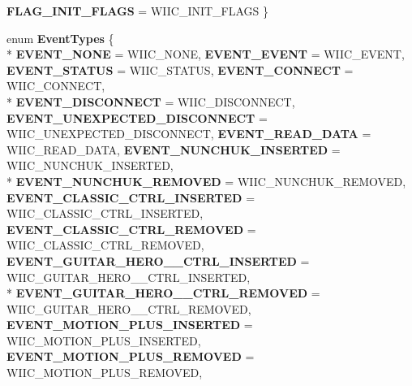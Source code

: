 \begin{DoxyCompactItemize}
{\bfseries F\-L\-A\-G\-\_\-\-I\-N\-I\-T\-\_\-\-F\-L\-A\-G\-S} =  W\-I\-I\-C\-\_\-\-I\-N\-I\-T\-\_\-\-F\-L\-A\-G\-S
 \}
\item 
enum {\bfseries Event\-Types} \{ \\*
{\bfseries E\-V\-E\-N\-T\-\_\-\-N\-O\-N\-E} =  W\-I\-I\-C\-\_\-\-N\-O\-N\-E, 
{\bfseries E\-V\-E\-N\-T\-\_\-\-E\-V\-E\-N\-T} =  W\-I\-I\-C\-\_\-\-E\-V\-E\-N\-T, 
{\bfseries E\-V\-E\-N\-T\-\_\-\-S\-T\-A\-T\-U\-S} =  W\-I\-I\-C\-\_\-\-S\-T\-A\-T\-U\-S, 
{\bfseries E\-V\-E\-N\-T\-\_\-\-C\-O\-N\-N\-E\-C\-T} =  W\-I\-I\-C\-\_\-\-C\-O\-N\-N\-E\-C\-T, 
\\*
{\bfseries E\-V\-E\-N\-T\-\_\-\-D\-I\-S\-C\-O\-N\-N\-E\-C\-T} =  W\-I\-I\-C\-\_\-\-D\-I\-S\-C\-O\-N\-N\-E\-C\-T, 
{\bfseries E\-V\-E\-N\-T\-\_\-\-U\-N\-E\-X\-P\-E\-C\-T\-E\-D\-\_\-\-D\-I\-S\-C\-O\-N\-N\-E\-C\-T} =  W\-I\-I\-C\-\_\-\-U\-N\-E\-X\-P\-E\-C\-T\-E\-D\-\_\-\-D\-I\-S\-C\-O\-N\-N\-E\-C\-T, 
{\bfseries E\-V\-E\-N\-T\-\_\-\-R\-E\-A\-D\-\_\-\-D\-A\-T\-A} =  W\-I\-I\-C\-\_\-\-R\-E\-A\-D\-\_\-\-D\-A\-T\-A, 
{\bfseries E\-V\-E\-N\-T\-\_\-\-N\-U\-N\-C\-H\-U\-K\-\_\-\-I\-N\-S\-E\-R\-T\-E\-D} =  W\-I\-I\-C\-\_\-\-N\-U\-N\-C\-H\-U\-K\-\_\-\-I\-N\-S\-E\-R\-T\-E\-D, 
\\*
{\bfseries E\-V\-E\-N\-T\-\_\-\-N\-U\-N\-C\-H\-U\-K\-\_\-\-R\-E\-M\-O\-V\-E\-D} =  W\-I\-I\-C\-\_\-\-N\-U\-N\-C\-H\-U\-K\-\_\-\-R\-E\-M\-O\-V\-E\-D, 
{\bfseries E\-V\-E\-N\-T\-\_\-\-C\-L\-A\-S\-S\-I\-C\-\_\-\-C\-T\-R\-L\-\_\-\-I\-N\-S\-E\-R\-T\-E\-D} =  W\-I\-I\-C\-\_\-\-C\-L\-A\-S\-S\-I\-C\-\_\-\-C\-T\-R\-L\-\_\-\-I\-N\-S\-E\-R\-T\-E\-D, 
{\bfseries E\-V\-E\-N\-T\-\_\-\-C\-L\-A\-S\-S\-I\-C\-\_\-\-C\-T\-R\-L\-\_\-\-R\-E\-M\-O\-V\-E\-D} =  W\-I\-I\-C\-\_\-\-C\-L\-A\-S\-S\-I\-C\-\_\-\-C\-T\-R\-L\-\_\-\-R\-E\-M\-O\-V\-E\-D, 
{\bfseries E\-V\-E\-N\-T\-\_\-\-G\-U\-I\-T\-A\-R\-\_\-\-H\-E\-R\-O\-\_\-\_\-\-C\-T\-R\-L\-\_\-\-I\-N\-S\-E\-R\-T\-E\-D} =  W\-I\-I\-C\-\_\-\-G\-U\-I\-T\-A\-R\-\_\-\-H\-E\-R\-O\-\_\-\_\-\-C\-T\-R\-L\-\_\-\-I\-N\-S\-E\-R\-T\-E\-D, 
\\*
{\bfseries E\-V\-E\-N\-T\-\_\-\-G\-U\-I\-T\-A\-R\-\_\-\-H\-E\-R\-O\-\_\-\_\-\-C\-T\-R\-L\-\_\-\-R\-E\-M\-O\-V\-E\-D} =  W\-I\-I\-C\-\_\-\-G\-U\-I\-T\-A\-R\-\_\-\-H\-E\-R\-O\-\_\-\_\-\-C\-T\-R\-L\-\_\-\-R\-E\-M\-O\-V\-E\-D, 
{\bfseries E\-V\-E\-N\-T\-\_\-\-M\-O\-T\-I\-O\-N\-\_\-\-P\-L\-U\-S\-\_\-\-I\-N\-S\-E\-R\-T\-E\-D} =  W\-I\-I\-C\-\_\-\-M\-O\-T\-I\-O\-N\-\_\-\-P\-L\-U\-S\-\_\-\-I\-N\-S\-E\-R\-T\-E\-D, 
{\bfseries E\-V\-E\-N\-T\-\_\-\-M\-O\-T\-I\-O\-N\-\_\-\-P\-L\-U\-S\-\_\-\-R\-E\-M\-O\-V\-E\-D} =  W\-I\-I\-C\-\_\-\-M\-O\-T\-I\-O\-N\-\_\-\-P\-L\-U\-S\-\_\-\-R\-E\-M\-O\-V\-E\-D, 

\end{DoxyCompactItemize}
